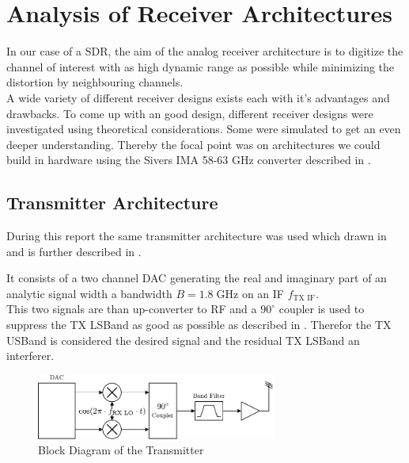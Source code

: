 \chapter{Analysis of Receiver Architectures}
\label{chap:rx}

In our case of a \gls{SDR}, the aim of the analog receiver architecture is to
digitize the channel of interest with as high dynamic range as possible while
minimizing the distortion by neighbouring channels. \\

A wide variety of different receiver designs exists each with it's advantages
and drawbacks. To come up with an good design, different receiver designs
were investigated using theoretical considerations. Some were simulated to
get an even deeper understanding.
Thereby the focal point was on architectures we could
build in hardware using the Sivers IMA 58-63 GHz converter described in
. \\

\section{Transmitter Architecture}
During this report the same transmitter architecture was used which drawn
in  and is further described in
.

It consists of a two channel \gls{DAC} generating the real and imaginary
part of an analytic signal width a bandwidth $B = 1.8 \; \text{GHz}$
on an \gls{IF} $f_{\text{TX IF}}$. \\

This two signals are than up-converter to
\gls{RF} and a $90^\circ$ coupler is used to suppress the \gls{TX} \gls{LSBand}
as good as possible as described in .
Therefor the \gls{TX} \gls{USBand} is considered the desired signal and the
residual \gls{TX} \gls{LSBand} an interferer. \\

\begin{figure}[p]
  \centering
  \includegraphics[width=0.7\textwidth]{figures/tx_block_diagram}
  \caption{Block Diagram of the Transmitter}
  \label{fig:tx_block_diagram}
\end{figure}

